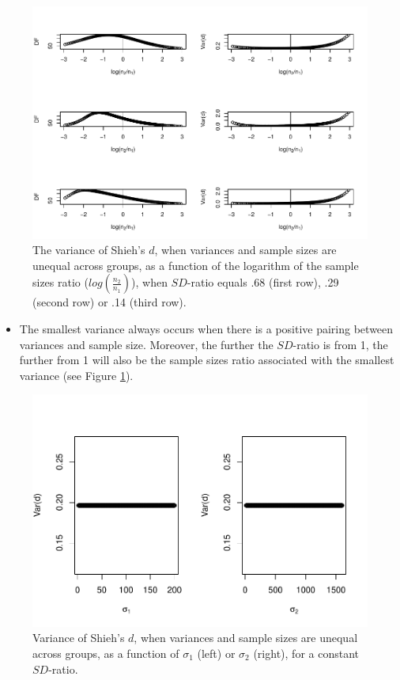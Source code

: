 \documentclass[
  english,
  man,mask]{apa6}
\providecommand{\tightlist}{%
  \setlength{\itemsep}{0pt}\setlength{\parskip}{0pt}}
\begin{document}
\begin{figure}
\centering
\includegraphics{Theoretical-Bias-of-all-estimators-as-a-function-of-population-parameters_files/figure-latex/varshiehhetunbaldfandvar-1.pdf}
\caption{\label{fig:varshiehhetunbaldfandvar}The variance of Shieh's \(d\), when variances and sample sizes are unequal across groups, as a function of the logarithm of the sample sizes ratio (\(log \left( \frac{n_2}{n_1} \right)\)), when \(SD\)-ratio equals .68 (first row), .29 (second row) or .14 (third row).}
\end{figure}

\begin{itemize}
\tightlist
\item
  The smallest variance always occurs when there is a positive pairing between variances and sample size. Moreover, the further the \(SD\)-ratio is from 1, the further from 1 will also be the sample sizes ratio associated with the smallest variance (see Figure \ref{fig:varshiehhetunbaldfandvar}).
\end{itemize}

\begin{figure}
\centering
\includegraphics{Theoretical-Bias-of-all-estimators-as-a-function-of-population-parameters_files/figure-latex/varshiehhetunbalvariance2-1.pdf}
\caption{\label{fig:varshiehhetunbalvariance2}Variance of Shieh's \(d\), when variances and sample sizes are unequal across groups, as a function of \(\sigma_1\) (left) or \(\sigma_2\) (right), for a constant \(SD\)-ratio.}
\end{figure}
\end{document}
